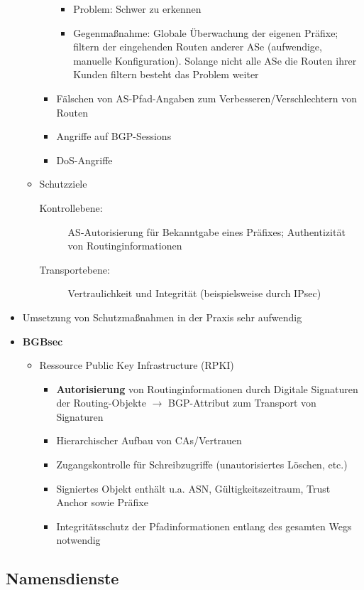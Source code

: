 \begin{itemize}
\begin{itemize}
\begin{itemize}
\begin{itemize}
				\item Problem: Schwer zu erkennen
				\item Gegenmaßnahme: Globale Überwachung der eigenen Präfixe; filtern der eingehenden Routen anderer ASe (aufwendige, manuelle Konfiguration). Solange nicht alle ASe die Routen ihrer Kunden filtern besteht das Problem weiter
			\end{itemize}
			\item Fälschen von AS-Pfad-Angaben zum Verbesseren/Verschlechtern von Routen
			\item Angriffe auf BGP-Sessions
			\item DoS-Angriffe
		\end{itemize}
		\item Schutzziele
		\begin{description}
			\item[Kontrollebene:] AS-Autorisierung für Bekanntgabe eines Präfixes; Authentizität von Routinginformationen
			\item[Transportebene:] Vertraulichkeit und Integrität (beispielsweise durch IPsec)
		\end{description}
	\end{itemize}
	\item Umsetzung von Schutzmaßnahmen in der Praxis sehr aufwendig
	\item \textbf{BGBsec}
	\begin{itemize}
		\item Ressource Public Key Infrastructure (RPKI)
		\begin{itemize}
			\item \textbf{Autorisierung} von Routinginformationen durch Digitale Signaturen der Routing-Objekte \(\rightarrow\) BGP-Attribut zum Transport von Signaturen
			\item Hierarchischer Aufbau von CAs/Vertrauen
			\item Zugangskontrolle für Schreibzugriffe (unautorisiertes Löschen, etc.)
			\item Signiertes Objekt enthält u.a. ASN, Gültigkeitszeitraum, Trust Anchor sowie Präfixe
			\item Integritätsschutz der Pfadinformationen entlang des gesamten Wegs notwendig
		\end{itemize}
	\end{itemize}
\end{itemize}


\subsection{Namensdienste}

